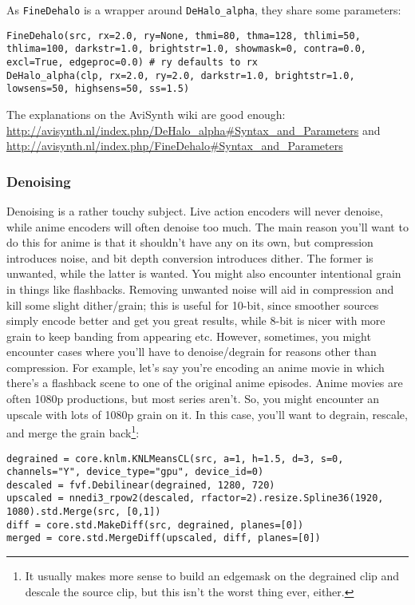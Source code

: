 \documentclass{scrartcl}
\begin{document}
As \texttt{FineDehalo} is a wrapper around \texttt{DeHalo\_alpha}, they share some parameters:
\begin{lstlisting}
FineDehalo(src, rx=2.0, ry=None, thmi=80, thma=128, thlimi=50, thlima=100, darkstr=1.0, brightstr=1.0, showmask=0, contra=0.0, excl=True, edgeproc=0.0) # ry defaults to rx
DeHalo_alpha(clp, rx=2.0, ry=2.0, darkstr=1.0, brightstr=1.0, lowsens=50, highsens=50, ss=1.5)
\end{lstlisting}
The explanations on the AviSynth wiki are good enough: \url{http://avisynth.nl/index.php/DeHalo_alpha#Syntax_and_Parameters} and \url{http://avisynth.nl/index.php/FineDehalo#Syntax_and_Parameters}

\subsubsection{Denoising}

Denoising is a rather touchy subject.  Live action encoders will never denoise, while anime encoders will  often denoise too much.
The main reason you'll want to do this for anime is that it shouldn't have any on its own, but compression introduces noise, and bit depth conversion introduces dither.  The former is unwanted, while the latter is wanted.  You might also encounter intentional grain in things like flashbacks.  Removing unwanted noise will aid in compression and kill some slight dither/grain; this is useful for 10-bit, since smoother sources simply encode better and get you great results, while 8-bit is nicer with more grain to keep banding from appearing etc.
However, sometimes, you might encounter cases where you'll have to denoise/degrain for reasons other than compression.
For example, let's say you're encoding an anime movie in which there's a flashback scene to one of the original anime episodes. 
Anime movies are often 1080p productions, but most series aren't.
So, you might encounter an upscale with lots of 1080p grain on it.
In this case, you'll want to degrain, rescale, and merge the grain back\footnote{It usually makes more sense to build an edgemask on the degrained clip and descale the source clip, but this isn't the worst thing ever, either.}:
\begin{lstlisting}
degrained = core.knlm.KNLMeansCL(src, a=1, h=1.5, d=3, s=0, channels="Y", device_type="gpu", device_id=0)
descaled = fvf.Debilinear(degrained, 1280, 720)
upscaled = nnedi3_rpow2(descaled, rfactor=2).resize.Spline36(1920, 1080).std.Merge(src, [0,1])
diff = core.std.MakeDiff(src, degrained, planes=[0])
merged = core.std.MergeDiff(upscaled, diff, planes=[0])
\end{lstlisting}
\end{document}
